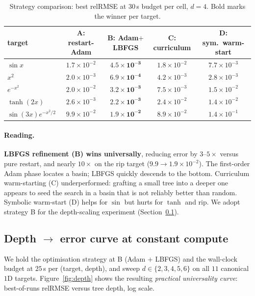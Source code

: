 \documentclass[11pt]{article}
\begin{document}
\begin{table}[h]
\centering\small
\caption{Strategy comparison: best relRMSE at $30\,$s budget per cell, $d{=}4$.
Bold marks the winner per target.}
\label{tab:strategy}
\begin{tabular}{lcccc}
\toprule
target & A: restart-Adam & B: Adam$+$LBFGS & C: curriculum & D: sym.\ warm-start \\
\midrule
$\sin x$               & $1.7\!\times\!10^{-2}$ & $\mathbf{4.5\!\times\!10^{-3}}$ & $1.8\!\times\!10^{-2}$ & $7.7\!\times\!10^{-3}$ \\
$x^2$                  & $2.0\!\times\!10^{-3}$ & $\mathbf{6.9\!\times\!10^{-4}}$ & $4.2\!\times\!10^{-3}$ & $2.8\!\times\!10^{-3}$ \\
$e^{-x^2}$             & $2.0\!\times\!10^{-2}$ & $\mathbf{3.2\!\times\!10^{-3}}$ & $7.5\!\times\!10^{-3}$ & $1.5\!\times\!10^{-2}$ \\
$\tanh(2x)$            & $2.6\!\times\!10^{-3}$ & $\mathbf{2.2\!\times\!10^{-3}}$ & $2.4\!\times\!10^{-2}$ & $1.4\!\times\!10^{-2}$ \\
$\sin(3x)e^{-x^2/2}$   & $9.9\!\times\!10^{-2}$ & $\mathbf{1.9\!\times\!10^{-2}}$ & $8.9\!\times\!10^{-2}$ & $1.4\!\times\!10^{-1}$ \\
\bottomrule
\end{tabular}
\end{table}

\paragraph{Reading.}
\textbf{LBFGS refinement (B) wins universally}, reducing error by $3$--$5\times$
versus pure restart, and nearly $10\times$ on the rip target ($9.9 \to 1.9
\times 10^{-2}$). The first-order Adam phase locates a basin; LBFGS quickly
descends to the bottom. Curriculum warm-starting (C) underperformed: grafting a
small tree into a deeper one appears to seed the search in a basin that is
not reliably better than random. Symbolic warm-start (D) helps for $\sin$
but hurts for $\tanh$ and rip. We adopt strategy B for the depth-scaling
experiment (Section~\ref{sec:universality}).

\subsection{Depth $\to$ error curve at constant compute}
\label{sec:universality}

We hold the optimisation strategy at B (Adam $+$ LBFGS) and the wall-clock
budget at $25\,$s per (target, depth), and sweep $d \in \{2, 3, 4, 5, 6\}$
on all $11$ canonical $1$D targets. Figure~\ref{fig:depth} shows the resulting
\emph{practical universality curve}: best-of-runs relRMSE versus tree depth,
log scale.
\end{document}
